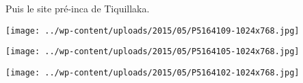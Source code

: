 Puis le site pré-inca de Tiquillaka. 
\begin{center} \texttt{[image: ../wp-content/uploads/2015/05/P5164109-1024x768.jpg]} \end{center}
\begin{center} \texttt{[image: ../wp-content/uploads/2015/05/P5164105-1024x768.jpg]} \end{center}
\begin{center} \texttt{[image: ../wp-content/uploads/2015/05/P5164102-1024x768.jpg]} \end{center}
